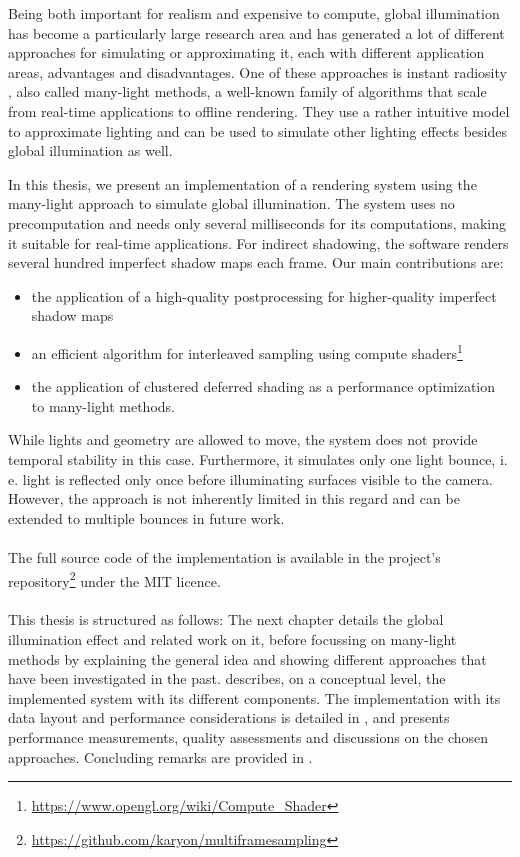 Being both important for realism and expensive to compute, global illumination has become a particularly large research area and has generated a lot of different approaches for simulating or approximating it, each with different application areas, advantages and disadvantages. One of these approaches is instant radiosity \citep{Keller:1997:InstantRadiosity}, also called many-light methods, a well-known family of algorithms that scale from real-time applications to offline rendering. They use a rather intuitive model to approximate lighting and can be used to simulate other lighting effects besides global illumination as well.

In this thesis, we present an implementation of a rendering system using the many-light approach to simulate global illumination. The system uses no precomputation and needs only several milliseconds for its computations, making it suitable for real-time applications. For indirect shadowing, the software renders several hundred imperfect shadow maps \citep{ritschel2008ism} each frame. Our main contributions are:
\begin{itemize}
    \item the application of a high-quality postprocessing for higher-quality imperfect shadow maps
    \item an efficient algorithm for interleaved sampling \citep{Keller:2001:InterleavedSampling} using compute shaders\footnote{\url{https://www.opengl.org/wiki/Compute_Shader}}
    \item the application of clustered deferred shading \citep{olsson2012clustered} as a performance optimization to many-light methods.
\end{itemize}

While lights and geometry are allowed to move, the system does not provide temporal stability in this case. Furthermore, it simulates only one light bounce, i.\,e. light is reflected only once before illuminating surfaces visible to the camera. However, the approach is not inherently limited in this regard and can be extended to multiple bounces in future work.
\\
\\
The full source code of the implementation is available in the project's repository\footnote{\url{https://github.com/karyon/multiframesampling}} under the MIT licence.
\\
\\
This thesis is structured as follows: The next chapter details the global illumination effect and related work on it, before focussing on many-light methods by explaining the general idea and showing different approaches that have been investigated in the past.  describes, on a conceptual level, the implemented system with its different components. The implementation with its data layout and performance considerations is detailed in , and  presents performance measurements, quality assessments and discussions on the chosen approaches. Concluding remarks are provided in .


\cleardoublepage

